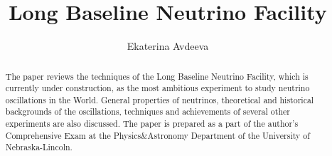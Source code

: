 \documentclass{article}
\begin{document}
 
\pagenumbering{}
\title{\textbf{Long Baseline Neutrino Facility}}

\author{Ekaterina Avdeeva}

\maketitle

\begin{abstract}
The paper reviews the techniques of the Long Baseline Neutrino Facility, which is currently under construction, as the most ambitious experiment to study neutrino oscillations in the World. General properties of neutrinos, theoretical and historical backgrounds of the oscillations, techniques and achievements of several other experiments are also discussed. The paper is prepared as a part of the author's Comprehensive Exam at the Physics\&Astronomy Department of the University of Nebraska-Lincoln.
\end{abstract}




\pagestyle{fancy}
\fancyhf{}
\lhead[]{\thepage}
\rhead[\thepage]{}

\tableofcontents

%

\clearpage

\clearpage

\clearpage

\clearpage

\clearpage

\clearpage

\clearpage
\end{document}
